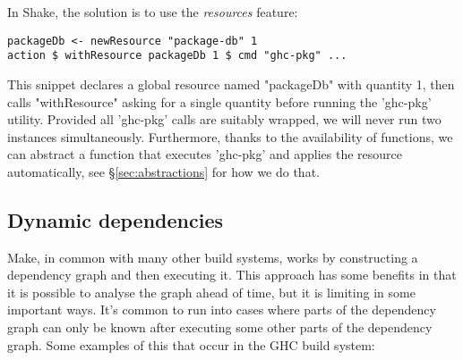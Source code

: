 In Shake, the solution is to use the \emph{resources} feature:

\begin{lstlisting}
packageDb <- newResource "package-db" 1
action $ withResource packageDb 1 $ cmd "ghc-pkg" ...
\end{lstlisting}

This snippet declares a global resource named \lst"packageDb" with quantity 1,
then calls \lst"withResource" asking for a single quantity before running the
\lst'ghc-pkg' utility. Provided all \lst'ghc-pkg' calls are suitably wrapped,
we will never run two instances simultaneously. Furthermore, thanks to the
availability of functions, we can abstract a function that executes
\lst'ghc-pkg' and applies the resource automatically, see
\S\ref{sec:abstractions} for how we do that.

\subsection{Dynamic dependencies\label{sec:dynamic-deps}}


Make, in common with many other build systems, works by
constructing a dependency graph and then executing it. This approach
has some benefits in that it is possible to analyse the graph ahead of
time, but it is limiting in some important ways.  It's common to run
into cases where parts of the dependency graph can only be known after
executing some other parts of the dependency graph.  Some examples of
this that occur in the GHC build system:

